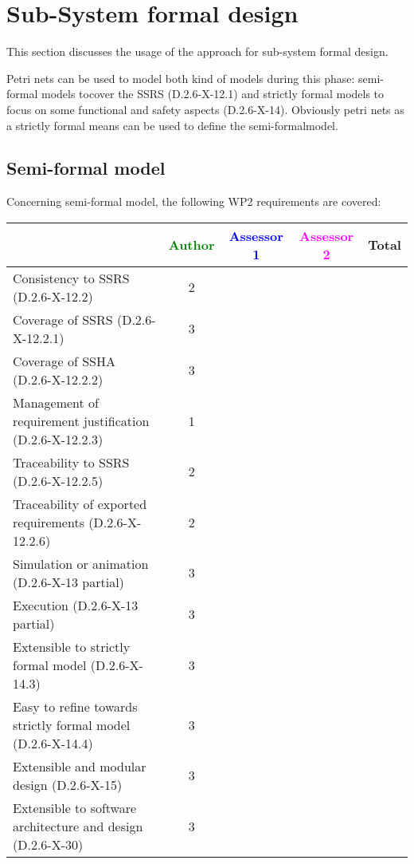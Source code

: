 \section{Sub-System formal design}
This section discusses the usage of the approach for sub-system formal design.

Petri nets can be used to model both kind of models during this phase: semi-formal models tocover the SSRS (D.2.6-X-12.1) and strictly formal  models to  focus on some functional and safety aspects (D.2.6-X-14).  Obviously petri nets as a strictly  formal means can be used to define the semi-formalmodel.

\subsection{Semi-formal model}

Concerning semi-formal model, the following WP2 requirements are covered:

\begin{tabular}{|l | c | c | c | c|}
\hline
& \textcolor{green}{Author} & \textcolor{blue}{Assessor 1} & \textcolor{magenta}{Assessor 2} & Total \\
\hline 
Consistency to SSRS (D.2.6-X-12.2) & 2 & & &  \\
\hline
Coverage of SSRS (D.2.6-X-12.2.1)  & 3 & & &  \\
\hline
Coverage of SSHA (D.2.6-X-12.2.2)  & 3 & & &  \\
\hline
Management of requirement justification (D.2.6-X-12.2.3)  & 1 & & &  \\
\hline
Traceability to  SSRS (D.2.6-X-12.2.5)  & 2 & & &  \\
\hline
Traceability of exported requirements (D.2.6-X-12.2.6)  & 2 & & &  \\
\hline
Simulation or animation (D.2.6-X-13 partial)  & 3 & & &  \\
\hline
Execution (D.2.6-X-13 partial)  & 3 & & &  \\
\hline
Extensible to strictly formal model (D.2.6-X-14.3) & 3 & & &  \\
\hline
Easy to  refine towards strictly formal model (D.2.6-X-14.4) & 3 & & &  \\
\hline
Extensible and modular design (D.2.6-X-15)  & 3 & & &  \\
\hline
Extensible to software architecture and design (D.2.6-X-30)   & 3 & & &  \\
\hline
\end{tabular}

